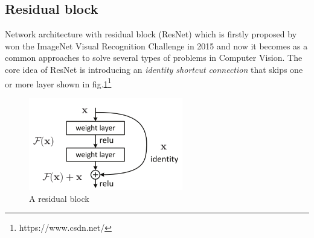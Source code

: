 \subsection{Residual block}
\hspace{0.45cm} Network architecture with residual block (ResNet) which is firstly proposed by \cite{He_2016_CVPR} won the ImageNet Visual Recognition Challenge in 2015 and now it becomes as a common approaches to solve several types of problems in Computer Vision. The core idea of ResNet is introducing an \textit{identity shortcut connection} 
that skips one or more layer shown in fig.\ref{fig:res_block}\footnote{https://www.csdn.net/}
\begin{figure}[h!]
    \centering
    \includegraphics[width=0.6\textwidth]{Chapters/Fig/res_block.png}
    \caption{A residual block}
    \label{fig:res_block}
\end{figure}\par

